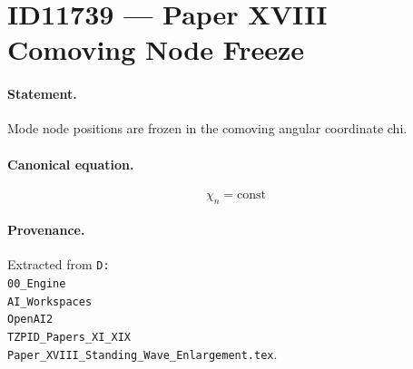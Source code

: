 \section*{ID11739 --- Paper XVIII Comoving Node Freeze}

\paragraph{Statement.}
Mode node positions are frozen in the comoving angular coordinate chi.

\paragraph{Canonical equation.}
\[
\chi_n=\mathrm{const}
\]

\paragraph{Provenance.}
Extracted from \texttt{D:\\00\_Engine\\AI\_Workspaces\\OpenAI2\\TZPID\_Papers\_XI\_XIX\\Paper\_XVIII\_Standing\_Wave\_Enlargement.tex}.
